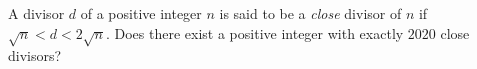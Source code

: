 A divisor $d$ of a positive integer $n$ is said to be a \textit{close} divisor of $n$ if $\sqrt{n}<d<2\sqrt{n}$. Does there exist a positive integer with exactly $2020$ close divisors?